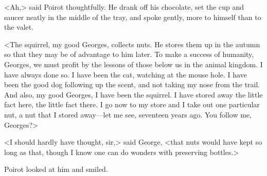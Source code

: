 <Ah,> said Poirot thoughtfully. He drank off his chocolate, set the cup and saucer neatly in the middle of the tray, and spoke gently, more to himself than to the valet.

<The squirrel, my good Georges, collects nuts. He stores them up in the autumn so that they may be of advantage to him later. To make a success of humanity, Georges, we must profit by the lessons of those below us in the animal kingdom. I have always done so. I have been the cat, watching at the mouse hole. I have been the good dog following up the scent, and not taking my nose from the trail. And also, my good Georges, I have been the squirrel. I have stored away the little fact here, the little fact there. I go now to my store and I take out one particular nut, a nut that I stored away—let me see, seventeen years ago. You follow me, Georges?>

<I should hardly have thought, sir,> said George, <that nuts would have kept so long as that, though I know one can do wonders with preserving bottles.>

Poirot looked at him and smiled.